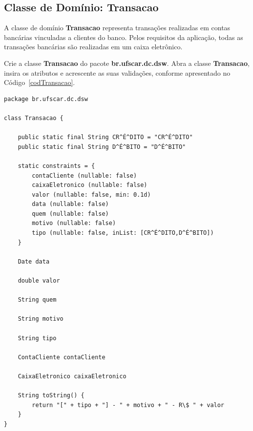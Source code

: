 \subsection{Classe de Domínio: Transacao}\label{secTransacao}

\vspace{0.5cm}

A classe de  domínio {\bf Transacao} representa transações  realizadas em contas
bancárias vinculadas a clientes do  banco.  Pelos requisitos da aplicação, todas
as transações bancárias são realizadas em um caixa eletrônico.

Crie a classe  {\bf Transacao} do pacote {\bf  br.ufscar.dc.dsw}.  Abra a classe
{\bf Transacao}, insira  os atributos e acrescente as  suas validações, conforme
apresentado no Código~\ref{codTransacao}.  

\begin{lstlisting}[caption=Classe  de  domínio {\bf  Transacao},  frame =  trBL,
    float=htbp, label=codTransacao] 
package br.ufscar.dc.dsw

class Transacao {
    
    public static final String CR^É^DITO = "CR^É^DITO"
    public static final String D^É^BITO = "D^É^BITO"
    
    static constraints = {
        contaCliente (nullable: false)
        caixaEletronico (nullable: false)
        valor (nullable: false, min: 0.1d)
        data (nullable: false)
        quem (nullable: false)
        motivo (nullable: false)
        tipo (nullable: false, inList: [CR^É^DITO,D^É^BITO])
    }
        
    Date data
    
    double valor
    
    String quem
    
    String motivo
    
    String tipo
    
    ContaCliente contaCliente
    
    CaixaEletronico caixaEletronico

    String toString() {
        return "[" + tipo + "] - " + motivo + " - R\$ " + valor 
    }
}
\end{lstlisting}

\hspace{1cm}\\

